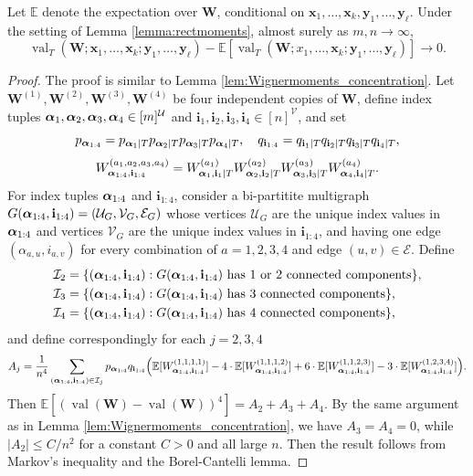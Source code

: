 \documentclass[10pt,reqno]{amsart}
\def\a{\alpha}
\def\x{\mathbf{x}}
\def\y{\mathbf{y}}
\def\W{\mathbf{W}}
\def\E{\mathbb{E}}
\def\cU{\mathcal{U}}
\def\cV{\mathcal{V}}
\def\cE{\mathcal{E}}
\def\val{\operatorname{val}}
\def\bi{\mathbf{i}}
\begin{document}
\begin{lemma}\label{lemma:rectfourthmoment}
Let $\E$ denote the expectation over $\W$, conditional on $\x_1,\ldots,\x_k,\y_1,\ldots,\y_\ell$. Under the setting of Lemma \ref{lemma:rectmoments}, almost
surely as $m,n \to \infty$,
\[\val_T(\W;\x_1,\ldots,\x_k;\y_1,\ldots,\y_\ell)
-\E[\val_T(\W;x_1,\ldots,\x_k;\y_1,\ldots,\y_\ell)] \to 0.\]
\end{lemma}
\begin{proof}
The proof is similar to Lemma \ref{lem:Wignermoments_concentration}.
Let $\W^{(1)},\W^{(2)},\W^{(3)},\W^{(4)}$ be four independent copies of $\W$,
define index tuples $\balpha_1,\balpha_2,\balpha_3,\balpha_4 \in [m]^\cU$
and $\bi_1,\bi_2,\bi_3,\bi_4 \in [n]^\cV$, and set
\[p_{\balpha_{1:4}}=p_{\balpha_1|T}p_{\balpha_2|T}p_{\balpha_3|T}p_{\balpha_4|T},
\quad q_{\bi_{1:4}}=q_{\bi_1|T}q_{\bi_2|T}q_{\bi_3|T}q_{\bi_4|T},\]
\[W_{\balpha_{1:4},\bi_{1:4}}^{(a_1,a_2,a_3,a_4)}
=W_{\balpha_1,\bi_1|T}^{(a_1)}W_{\balpha_2,\bi_2|T}^{(a_2)}
W_{\balpha_3,\bi_3|T}^{(a_3)}W_{\balpha_4,\bi_4|T}^{(a_4)}.\]
For index tuples $\bm{\alpha}_{1:4}$ and $\bi_{1:4}$, consider a bi-partitite
multigraph $G(\balpha_{1:4},\bi_{1:4})=(\cU_G,\cV_G,\cE_G)$ whose vertices
$\cU_G$ are the unique index values in $\bm{\alpha}_{1:4}$ and vertices $\cV_G$
are the unique index values in $\bi_{1:4}$, and having one edge
$(\a_{a,u},i_{a,v})$ for every combination of $a=1,2,3,4$ and edge $(u,v) \in
\cE$. Define
\begin{align*}
\cI_2&=\{(\balpha_{1:4},\bi_{1:4}):G(\balpha_{1:4},\bi_{1:4}) \text{ has } 1
\text{ or } 2 \text{ connected components\}},\\
\cI_3&=\{(\balpha_{1:4},\bi_{1:4}):G(\balpha_{1:4},\bi_{1:4}) \text{ has } 3
\text{ connected components\}},\\
\cI_4&=\{(\balpha_{1:4},\bi_{1:4}):G(\balpha_{1:4},\bi_{1:4}) \text{ has } 4
\text{ connected components\}},
\end{align*}
and define correspondingly for each $j=2, 3, 4$
\[A_j=\frac{1}{n^4}\sum_{(\balpha_{1:4},\bi_{1:4}) \in \cI_j}
p_{\balpha_{1:4}}q_{\bi_{1:4}}\Big(\E[W_{\balpha_{1:4},\bi_{1:4}}^{(1,1,1,1)}]
-4 \cdot \E[W_{\balpha_{1:4},\bi_{1:4}}^{(1,1,1,2)}]
+6 \cdot \E[W_{\balpha_{1:4},\bi_{1:4}}^{(1,1,2,3)}]
-3 \cdot \E[W_{\balpha_{1:4},\bi_{1:4}}^{(1,2,3,4)}]\Big).\]
Then $\E[(\val(\W)-\val(\W))^4]=A_2+A_3+A_4$.
By the same argument as in Lemma \ref{lem:Wignermoments_concentration},
we have $A_3=A_4=0$, while $|A_2| \leq C/n^2$ for a constant $C>0$ and all large
$n$. Then the result follows from Markov's inequality and the Borel-Cantelli
lemma.
\end{proof}
\end{document}
